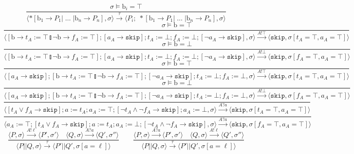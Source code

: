 \documentclass{article}
\begin{document}
$$    \frac{\sigma \models \mathrm{b}_i = \top} {\langle *[ \mathrm{b}_1 \rightarrow P_1  | \; \ldots \; | \mathrm{b}_n \rightarrow P_n ] , \sigma \rangle \xrightarrow{\tau} \langle P_i;\;*[ \mathrm{b}_1 \rightarrow P_1  | \; \ldots \; | \mathrm{b}_n \rightarrow P_n ] , \sigma\rangle  } $$$$
    \frac{\sigma \models \mathrm{b} = \top}{\langle [\mathrm{b} \rightarrow t_A := \top \talloblong \neg \mathrm{b} \rightarrow f_A := \top]; [a_A \rightarrow \mathtt{skip}]; t_A := \bot; f_A := \bot; [\neg a_A \rightarrow \mathtt{skip}], \sigma \rangle \xrightarrow{A!\top} \langle \mathtt{skip}, \sigma[t_A = \top, a_A = \top] \rangle} $$$$
    \frac{\sigma \models \mathrm{b} = \bot}{\langle [\mathrm{b} \rightarrow t_A := \top \talloblong \neg \mathrm{b} \rightarrow f_A := \top]; [a_A \rightarrow \mathtt{skip}]; t_A := \bot; f_A := \bot; [\neg a_A \rightarrow \mathtt{skip}], \sigma \rangle \xrightarrow{A!\bot} \langle \mathtt{skip}, \sigma[f_A = \top, a_A = \top] \rangle} $$$$
    \frac{\sigma \models \mathrm{b} = \top}{\langle [a_A \rightarrow \mathtt{skip}]; [\mathrm{b} \rightarrow t_A := \top \talloblong \neg \mathrm{b} \rightarrow f_A := \top]; [\neg a_A \rightarrow \mathtt{skip}]; t_A := \bot; f_A := \bot, \sigma \rangle \xrightarrow{A!\top} \langle \mathtt{skip}, \sigma[t_A = \top, a_A = \top] \rangle} $$$$
    \frac{\sigma \models \mathrm{b} = \bot}{\langle [a_A \rightarrow \mathtt{skip}]; [\mathrm{b} \rightarrow t_A := \top \talloblong \neg \mathrm{b} \rightarrow f_A := \top]; [\neg a_A \rightarrow \mathtt{skip}]; t_A := \bot; f_A := \bot, \sigma \rangle \xrightarrow{A!\bot} \langle \mathtt{skip}, \sigma[f_A = \top, a_A = \top] \rangle} $$$$
    \frac{}{\langle [t_A \vee f_A \rightarrow \mathtt{skip}]; a := t_A; a_A := \top; [\neg t_A \wedge \neg f_A \rightarrow \mathtt{skip}]; a_A := \bot, \sigma \rangle \xrightarrow{A?a} \langle \mathtt{skip}, \sigma[t_A = \top, a_A = \top] \rangle} $$$$
    \frac{}{\langle a_A := \top; [t_A \vee f_A \rightarrow \mathtt{skip}]; a := t_A; a_A := \bot; [\neg t_A \wedge \neg f_A \rightarrow \mathtt{skip}], \sigma \rangle \xrightarrow{A?a} \langle \mathtt{skip}, \sigma[f_A = \top, a_A = \top] \rangle} $$$$
    \frac{\langle P, \sigma \rangle \xrightarrow{A!\ell} \langle P', \sigma' \rangle \quad \langle Q, \sigma \rangle \xrightarrow {A?a} \langle Q', \sigma'' \rangle}{\langle P || Q, \sigma \rangle \xrightarrow{\tau} \langle P' || Q', \sigma[a = \ell] \rangle} \qquad
    \frac{\langle P, \sigma \rangle \xrightarrow{A?a} \langle P', \sigma' \rangle \quad \langle Q, \sigma \rangle \xrightarrow {A!\ell} \langle Q', \sigma'' \rangle}{\langle P || Q, \sigma \rangle \xrightarrow{\tau} \langle P' || Q', \sigma[a = \ell] \rangle}
$$
\end{document}
